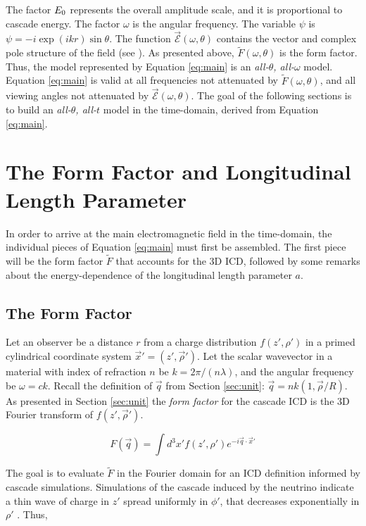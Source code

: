 \documentclass[amsmath,amssymb,aps,prd,10pt,twocolumn]{revtex4}
\begin{document}
The factor $E_{\rm 0}$ represents the overall amplitude scale, and it is proportional to cascade energy.  The factor $\omega$ is the angular frequency.  The variable $\psi$ is $\psi = -i \exp(ikr) \sin\theta$.  The function $\vec{\mathcal{E}}(\omega,\theta)$ contains the vector and complex pole structure of the field (see \cite{10.1016/j.astropartphys.2017.03.008}).  As presented above, $\widetilde{F}(\omega,\theta)$ is the form factor.  Thus, the model represented by Equation \ref{eq:main} is an \textit{all-$\theta$, all-$\omega$} model.  Equation \ref{eq:main} is valid at all frequencies not attenuated by $\widetilde{F}(\omega,\theta)$, and all viewing angles not attenuated by $\vec{\mathcal{E}}(\omega,\theta)$.  The goal of the following sections is to build an \textit{all-$\theta$, all-$t$} model in the time-domain, derived from Equation \ref{eq:main}.

\section{The Form Factor and Longitudinal Length Parameter}
\label{sec:ff}

In order to arrive at the main electromagnetic field in the time-domain, the individual pieces of Equation \ref{eq:main} must first be assembled.  The first piece will be the form factor $\widetilde{F}$ that accounts for the 3D ICD, followed by some remarks about the energy-dependence of the longitudinal length parameter $a$.

\subsection{The Form Factor}
\label{sec:ff1}

Let an observer be a distance $r$ from a charge distribution $f(z',\rho')$ in a primed cylindrical coordinate system $\vec{x}' = (z',\vec{\rho}')$.  Let the scalar wavevector in a material with index of refraction $n$ be $k = 2\pi/(n\lambda)$, and the angular frequency be $\omega = c k$.  Recall the definition of $\vec{q}$ from Section \ref{sec:unit}: $\vec{q} = nk(1, \vec{\rho}/R)$.  As presented in Section \ref{sec:unit} the \textit{form factor} for the cascade ICD is the 3D Fourier transform of $f(z',\vec{\rho}')$.

\begin{equation}
F(\vec{q}) = \int d^3 x' f(z',\rho') e^{-i \vec{q} \cdot \vec{x}'}
\end{equation}

The goal is to evaluate $\widetilde{F}$ in the Fourier domain for an ICD definition informed by cascade simulations.  Simulations of the cascade induced by the neutrino indicate a thin wave of charge in $z'$ spread uniformly in $\phi'$, that decreases exponentially in $\rho'$ \cite{10.1016/j.astropartphys.2017.03.008}.  Thus,
\end{document}
